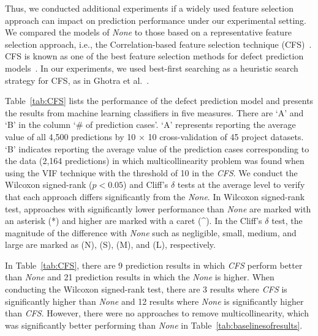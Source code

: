 Thus, we conducted additional experiments if a widely used feature selection approach can impact on prediction performance under our experimental setting. We compared the models of \emph{None} to those based on a representative feature selection approach, i.e., the Correlation-based feature selection technique (CFS)~\cite{Hall99correlation-basedfeature}. CFS is known as one of the best feature selection methods for defect prediction models~\cite{ghotra2017msr}. In our experiments, we used best-first searching as a heuristic search strategy for CFS, as in Ghotra et al.~\cite{ghotra2017msr}. 


Table~\ref{tab:CFS} lists the performance of the defect prediction model and presents the results from machine learning classifiers in five measures. There are `A' and `B' in the column `\# of prediction cases'. `A' represents reporting the average value of all 4,500 predictions by 10 $\times$ 10 cross-validation of 45 project datasets. `B' indicates reporting the average value of the prediction cases corresponding to the data (2,164 predictions) in which multicollinearity problem was found when using the VIF technique with the threshold of 10 in the \emph{CFS}. 
We conduct the Wilcoxon signed-rank ($p<0.05$) and Cliff's $\delta$ tests at the average level to verify that each approach differs significantly from the \emph{None}. In Wilcoxon signed-rank test, approaches with significantly lower performance than \emph{None} are marked with an asterisk (*) and higher are marked with a caret (\textasciicircum{}). In the Cliff's $\delta$ test, the magnitude of the difference with \emph{None} such as negligible, small, medium, and large are marked as (N), (S), (M), and (L), respectively.

In Table~\ref{tab:CFS}, there are 9 prediction results in which \emph{CFS} perform better than \emph{None} and 21 prediction results in which the \emph{None} is higher. When conducting the Wilcoxon signed-rank test, there are 3 results where \emph{CFS} is significantly higher than \emph{None} and 12 results where \emph{None} is significantly higher than \emph{CFS}. 
However, there were no approaches to remove multicollinearity, which was significantly better performing than \emph{None} in Table~\ref{tab:baselinesofresults}.
 

